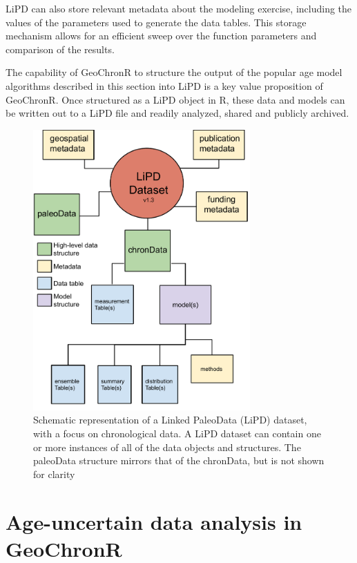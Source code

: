 \documentclass[gchron, manuscript]{copernicus}
\begin{document}
LiPD can also store relevant metadata about the modeling exercise, including the values of the parameters used to generate the data tables. This storage mechanism allows for an efficient sweep over the function parameters and comparison of the results.

The capability of GeoChronR to structure the output of the popular age model algorithms described in this section into LiPD is a key value proposition of GeoChronR.
Once structured as a LiPD object in R, these data and models can be written out to a LiPD file and readily analyzed, shared and publicly archived.

\begin{figure}
\includegraphics[width=8.3cm]{LPD schematic 1.3 - chronData} \caption{Schematic representation of a Linked PaleoData (LiPD) dataset, with a focus on chronological data. A LiPD dataset can contain one or more instances of all of the data objects and structures. The paleoData structure mirrors that of the chronData, but is not shown for clarity}\label{fig:lipd-chron}
\end{figure}

\hypertarget{sec:age-uncertain-analysis}{%
\section{Age-uncertain data analysis in GeoChronR}\label{sec:age-uncertain-analysis}}
\end{document}
